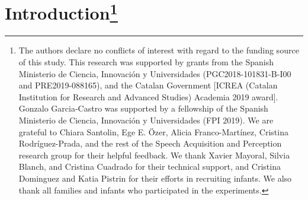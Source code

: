 \documentclass[
]{article}
\begin{document}
\hypertarget{introductionauthor-note}{%
\section[Introduction]{\texorpdfstring{Introduction\footnote{The authors
  declare no conflicts of interest with regard to the funding source of
  this study. This research was supported by grants from the Spanish
  Ministerio de Ciencia, Innovación y Universidades
  (PGC2018-101831-B-I00 and PRE2019-088165), and the Catalan Government
  {[}ICREA (Catalan Institution for Research and Advanced Studies)
  Academia 2019 award{]}. Gonzalo Garcia-Castro was supported by a
  fellowship of the Spanish Ministerio de Ciencia, Innovación y
  Universidades (FPI 2019). We are grateful to Chiara Santolin, Ege E.
  Özer, Alicia Franco-Martínez, Cristina Rodríguez-Prada, and the rest
  of the Speech Acquisition and Perception research group for their
  helpful feedback. We thank Xavier Mayoral, Silvia Blanch, and Cristina
  Cuadrado for their technical support, and Cristina Dominguez and Katia
  Pistrin for their efforts in recruiting infants. We also thank all
  families and infants who participated in the experiments.}}{Introduction}}\label{introductionauthor-note}}
\end{document}
